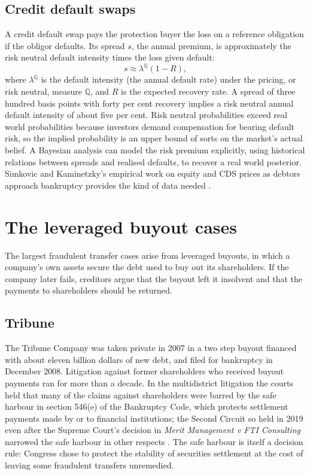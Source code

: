 \subsection{Credit default swaps}

A credit default swap pays the protection buyer the loss on a reference obligation if the obligor defaults. Its spread $s$, the annual premium, is approximately the risk neutral default intensity times the loss given default:
\begin{equation}
s \approx \lambda^{\mathbb{Q}} (1 - R),
\end{equation}
where $\lambda^{\mathbb{Q}}$ is the default intensity (the annual default rate) under the pricing, or risk neutral, measure $\mathbb{Q}$, and $R$ is the expected recovery rate. A spread of three hundred basis points with forty per cent recovery implies a risk neutral annual default intensity of about five per cent. Risk neutral probabilities exceed real world probabilities because investors demand compensation for bearing default risk, so the implied probability is an upper bound of sorts on the market's actual belief. A Bayesian analysis can model the risk premium explicitly, using historical relations between spreads and realised defaults, to recover a real world posterior. Simkovic and Kaminetzky's empirical work on equity and CDS prices as debtors approach bankruptcy provides the kind of data needed \citep{simkovic2011}.

\section{The leveraged buyout cases}

The largest fraudulent transfer cases arise from leveraged buyouts, in which a company's own assets secure the debt used to buy out its shareholders. If the company later fails, creditors argue that the buyout left it insolvent and that the payments to shareholders should be returned.

\subsection{Tribune}

The Tribune Company was taken private in 2007 in a two step buyout financed with about eleven billion dollars of new debt, and filed for bankruptcy in December 2008. Litigation against former shareholders who received buyout payments ran for more than a decade. In the multidistrict litigation the courts held that many of the claims against shareholders were barred by the safe harbour in section 546(e) of the Bankruptcy Code, which protects settlement payments made by or to financial institutions; the Second Circuit so held in 2019 even after the Supreme Court's decision in \emph{Merit Management v FTI Consulting} narrowed the safe harbour in other respects \citep{tribune2019,merit2018}. The safe harbour is itself a decision rule: Congress chose to protect the stability of securities settlement at the cost of leaving some fraudulent transfers unremedied.

